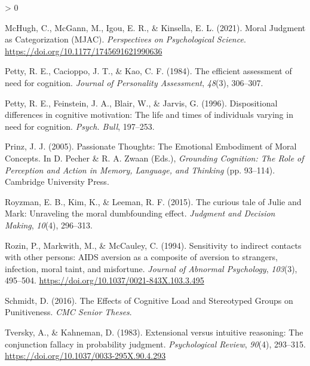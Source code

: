\documentclass[
  american,
  man,floatsintext]{apa7}
\newlength{\cslhangindent}
\newenvironment{CSLReferences}[2] %
 {%
  \setlength{\parindent}{0pt}
  \ifodd #1 \everypar{\setlength{\hangindent}{\cslhangindent}}\ignorespaces\fi
  \ifnum #2 > 0
  \setlength{\parskip}{#2\baselineskip}
  \fi
 }%
 {}
\begin{document}
\begin{CSLReferences}{1}{0}
\leavevmode\hypertarget{ref-mchugh_moral_2021}{}%
McHugh, C., McGann, M., Igou, E. R., \& Kinsella, E. L. (2021). Moral {Judgment} as {Categorization} ({MJAC}). \emph{Perspectives on Psychological Science}. \url{https://doi.org/10.1177/1745691621990636}

\leavevmode\hypertarget{ref-petty_efficient_1984}{}%
Petty, R. E., Cacioppo, J. T., \& Kao, C. F. (1984). The efficient assessment of need for cognition. \emph{Journal of Personality Assessment}, \emph{48}(3), 306--307.

\leavevmode\hypertarget{ref-petty_dispositional_1996}{}%
Petty, R. E., Feinstein, J. A., Blair, W., \& Jarvis, G. (1996). Dispositional differences in cognitive motivation: The life and times of individuals varying in need for cognition. \emph{Psych. Bull}, 197--253.

\leavevmode\hypertarget{ref-prinz_passionate_2005}{}%
Prinz, J. J. (2005). Passionate {Thoughts}: The {Emotional Embodiment} of {Moral Concepts}. In D. Pecher \& R. A. Zwaan (Eds.), \emph{Grounding {Cognition}: The {Role} of {Perception} and {Action} in {Memory}, {Language}, and {Thinking}} (pp. 93--114). {Cambridge University Press}.

\leavevmode\hypertarget{ref-royzman_curious_2015}{}%
Royzman, E. B., Kim, K., \& Leeman, R. F. (2015). The curious tale of {Julie} and {Mark}: Unraveling the moral dumbfounding effect. \emph{Judgment and Decision Making}, \emph{10}(4), 296--313.

\leavevmode\hypertarget{ref-rozin_sensitivity_1994}{}%
Rozin, P., Markwith, M., \& McCauley, C. (1994). Sensitivity to indirect contacts with other persons: {AIDS} aversion as a composite of aversion to strangers, infection, moral taint, and misfortune. \emph{Journal of Abnormal Psychology}, \emph{103}(3), 495--504. \url{https://doi.org/10.1037/0021-843X.103.3.495}

\leavevmode\hypertarget{ref-schmidt_effects_2016}{}%
Schmidt, D. (2016). The {Effects} of {Cognitive Load} and {Stereotyped Groups} on {Punitiveness}. \emph{CMC Senior Theses}.

\leavevmode\hypertarget{ref-tversky_extensional_1983}{}%
Tversky, A., \& Kahneman, D. (1983). Extensional versus intuitive reasoning: The conjunction fallacy in probability judgment. \emph{Psychological Review}, \emph{90}(4), 293--315. \url{https://doi.org/10.1037/0033-295X.90.4.293}

\end{CSLReferences}
\end{document}
